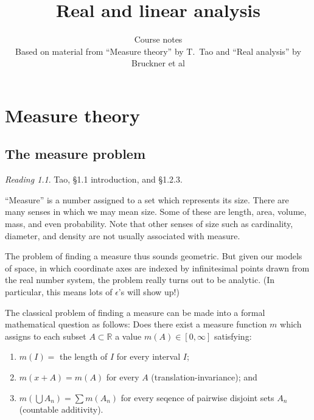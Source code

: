 \documentclass[11pt,oneside]{amsbook}
\title{Real and linear analysis}
\author{Course notes\\Based on material from ``Measure theory'' by T.\ Tao and ``Real analysis'' by Bruckner et al}
\newcommand{\RR}{\mathbb R}
\theoremstyle{definition}
\theoremstyle{plain}
\theoremstyle{definition}
\theoremstyle{remark}
\newtheorem*{reading}{Reading}
\numberwithin{equation}{section}
\numberwithin{figure}{section}
\begin{document}
\maketitle

\tableofcontents

\chapter{Measure theory}

\section{The measure problem}

\begin{reading}
  Tao, \S1.1 introduction, and \S1.2.3.
\end{reading}

``Measure'' is a number assigned to a set which represents its size. There are many senses in which we may mean size. Some of these are length, area, volume, mass, and even probability. Note that other senses of size such as cardinality, diameter, and density are not usually associated with measure.

The problem of finding a measure thus sounds geometric. But given our models of space, in which coordinate axes are indexed by infinitesimal points drawn from the real number system, the problem really turns out to be analytic. (In particular, this means lots of $\epsilon$'s will show up!)

The classical problem of finding a measure can be made into a formal mathematical question as follows: Does there exist a measure function $m$ which assigns to each subset $A\subset\RR$ a value $m(A)\in[0,\infty]$ satisfying:
\begin{enumerate}
\item $m(I)=$ the length of $I$ for every interval $I$;
\item $m(x+A)=m(A)$ for every $A$ (translation-invariance); and
\item $m(\bigcup A_n)=\sum m(A_n)$ for every seqence of pairwise disjoint sets $A_n$ (countable additivity).
\end{enumerate}
\end{document}
